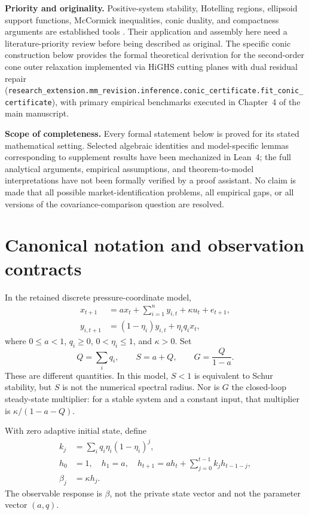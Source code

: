 \documentclass[11pt,a4paper]{article}
\theoremstyle{definition}\newtheorem{definition}[theorem]{Definition}
\theoremstyle{remark}\newtheorem{remark}[theorem]{Remark}
\begin{document}
\textbf{Priority and originality.} Positive-system stability, Hotelling regions, ellipsoid support functions, McCormick inequalities, conic duality, and compactness arguments are established tools \cite{rantzer,hotelling,boyd,mccormick}. Their application and assembly here need a literature-priority review before being described as original. The specific conic construction below provides the formal theoretical derivation for the second-order cone outer relaxation implemented via HiGHS cutting planes with dual residual repair (\nolinkurl{research_extension.mm_revision.inference.conic_certificate.fit_conic_certificate}), with primary empirical benchmarks executed in Chapter~4 of the main manuscript.

\textbf{Scope of completeness.} Every formal statement below is proved for its stated mathematical setting. Selected algebraic identities and model-specific lemmas corresponding to supplement results have been mechanized in Lean~4; the full analytical arguments, empirical assumptions, and theorem-to-model interpretations have not been formally verified by a proof assistant. No claim is made that all possible market-identification problems, all empirical gaps, or all versions of the covariance-comparison question are resolved.

\section{Canonical notation and observation contracts}
In the retained discrete pressure-coordinate model,
\begin{align}
 x_{t+1}&=a x_t+\sum_{i=1}^{n}y_{i,t}+\kappa u_t+e_{t+1},\label{eq:disc-x}\\
 y_{i,t+1}&=(1-\eta_i)y_{i,t}+\eta_iq_i x_t,\label{eq:disc-y}
\end{align}
where $0\le a<1$, $q_i\ge0$, $0<\eta_i\le1$, and $\kappa>0$. Set
\[
 Q=\sum_iq_i,\qquad S=a+Q,\qquad G=\frac{Q}{1-a}.
\]
These are different quantities. In this model, $S<1$ is equivalent to Schur stability, but $S$ is not the numerical spectral radius. Nor is $G$ the closed-loop steady-state multiplier: for a stable system and a constant input, that multiplier is $\kappa/(1-a-Q)$.

With zero adaptive initial state, define
\begin{align}
 k_j&=\sum_i q_i\eta_i(1-\eta_i)^j,\label{eq:kernel}\\
 h_0&=1,\quad h_1=a,\quad h_{t+1}=a h_t+\sum_{j=0}^{t-1}k_jh_{t-1-j},\label{eq:recurrence-h}\\
 \beta_j&=\kappa h_j.\label{eq:beta}
\end{align}
The observable response is $\beta$, not the private state vector and not the parameter vector $(a,q)$.
\end{document}
